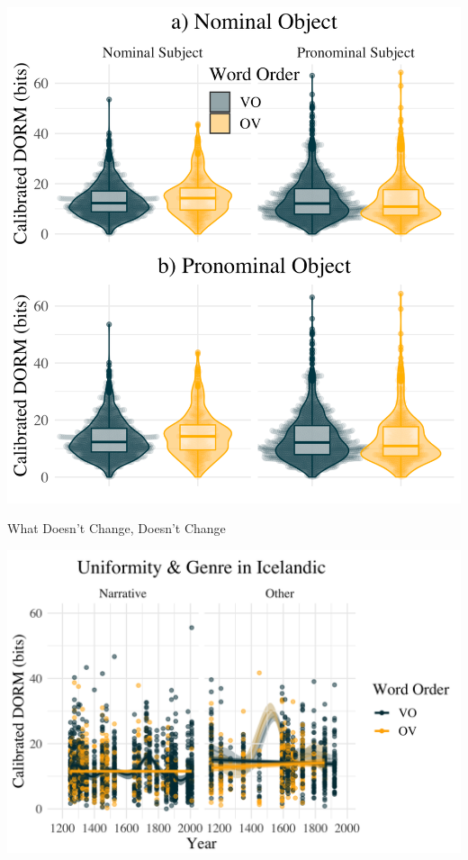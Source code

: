 \documentclass[hyperref={pdfpagelabels=false}]{beamer}
\begin{document}
\begin{frame}%
	
	
	\begin{center}
	\includegraphics[scale = 0.5]{NewFigType3.png}
\end{center}
	
\end{frame}

\begin{frame}{What Doesn't Change, Doesn't Change} 
	
	
		\includegraphics[scale = 0.2]{IcelandicGenreOutlierBehind.png}
	
\end{frame}
\end{document}
